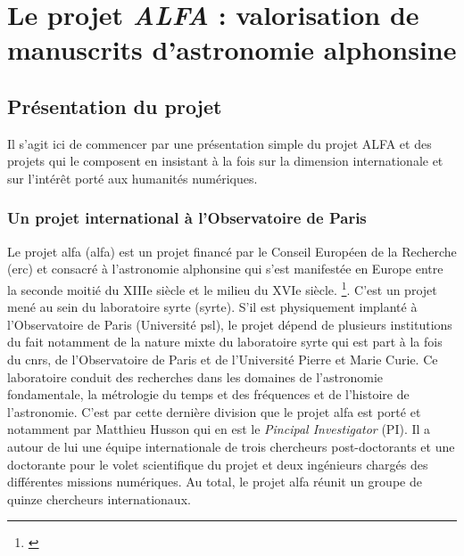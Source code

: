 	\part{Le projet \textit{ALFA} : valorisation de manuscrits d'astronomie alphonsine}

    \chapter{Présentation du projet}
	Il s'agit ici de commencer par une présentation simple du projet ALFA et des projets qui le composent en insistant à la fois sur la dimension internationale et sur l'intérêt porté aux humanités numériques. 
	
	\section{Un projet international à l’Observatoire de Paris}
	Le projet \acrshort{alfa} (\acrlong{alfa}) est un projet financé par le Conseil Européen de la Recherche (\acrshort{erc}) et consacré à l'astronomie alphonsine qui s'est manifestée en Europe entre la seconde moitié du XIIIe siècle et le milieu du XVIe siècle. \footnote{\cite{DISHASProjectAstronomical}}. C'est un projet mené au sein du laboratoire \acrlong{syrte} (\acrshort{syrte}). S'il est physiquement implanté à l'Observatoire de Paris (Université \acrshort{psl}), le projet dépend de plusieurs institutions du fait notamment de la nature mixte du laboratoire \acrshort{syrte} qui est part à la fois du \acrshort{cnrs}, de l'Observatoire de Paris et de l’Université Pierre et Marie Curie. Ce laboratoire conduit des recherches dans les domaines de l’astronomie fondamentale, la métrologie du temps et des fréquences et de l’histoire de l’astronomie. C'est par cette dernière division que le projet \acrshort{alfa} est porté et notamment par Matthieu Husson qui en est le \textit{Pincipal Investigator} (PI). Il a autour de lui une équipe internationale de trois chercheurs post-doctorants et une doctorante pour le volet scientifique du projet et deux ingénieurs chargés des différentes missions numériques. Au total, le projet \acrshort{alfa} réunit un groupe de quinze chercheurs internationaux.

